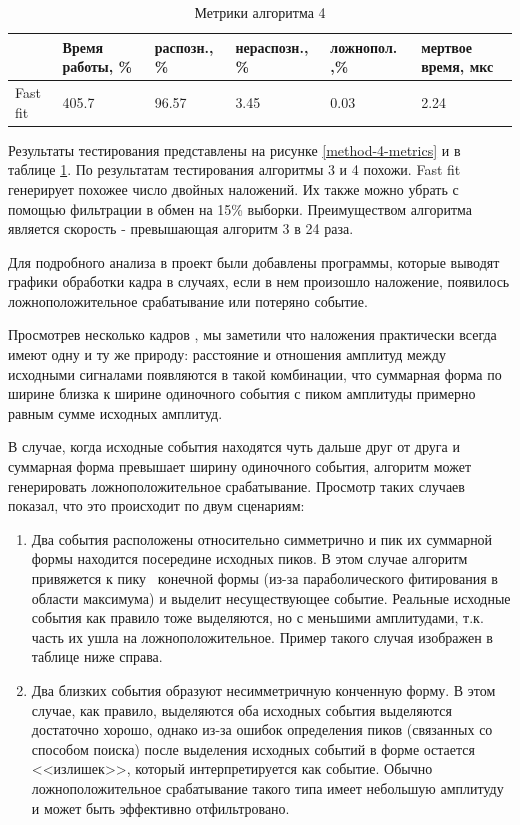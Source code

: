 \documentclass[a4paper,14pt]{extreport}
\begin{document}
\begin{table}
\centering
    \begin{tabular}{|p{}|p{}|p{}|p{}|p{}|p{}|}
        \hline
         & Время работы, \% & распозн., \% & нераспозн., \% & ложнопол. ,\% & мертвое время, мкс \\
        \hline
        Fast fit & 405.7 & 96.57 & 3.45 & 0.03 & 2.24 \\ 
        \hline
    \end{tabular} 
    \caption{Метрики алгоритма 4}
    \label{tbl:methods-compare-2}
\end{table}

Результаты тестирования представлены на рисунке \ref{method-4-metrics} и в таблице \ref{tbl:methods-compare-2}. По результатам тестирования алгоритмы 3 и 4 похожи. Fast fit генерирует похожее число двойных наложений. Их также можно убрать с помощью фильтрации в обмен на 15\% выборки. Преимуществом алгоритма является скорость - превышающая алгоритм 3 в 24 раза.

Для подробного анализа в проект были добавлены программы, которые выводят графики обработки кадра в случаях, если в нем произошло наложение, появилось ложноположительное срабатывание или потеряно событие.

Просмотрев несколько кадров , мы заметили что наложения практически всегда имеют одну и ту же природу: расстояние и отношения амплитуд между исходными сигналами появляются в такой комбинации, что суммарная форма по ширине близка к ширине одиночного события с пиком амплитуды примерно равным сумме исходных амплитуд.

В случае, когда исходные события находятся чуть дальше друг от друга и суммарная форма превышает ширину одиночного события, алгоритм может генерировать ложноположительное срабатывание. Просмотр таких случаев показал, что это происходит по двум сценариям:

\begin{enumerate}
    \item Два события расположены относительно симметрично и пик их суммарной формы находится посередине исходных пиков. В этом случае алгоритм привяжется к пику ~конечной формы (из-за параболического фитирования в области максимума) и выделит несуществующее событие. Реальные исходные события как правило тоже выделяются, но с меньшими амплитудами, т.к. часть их ушла на ложноположительное. Пример такого случая изображен в таблице ниже справа.
    \item Два близких события образуют несимметричную конченную форму. В этом случае, как правило, выделяются оба исходных события выделяются достаточно хорошо, однако из-за ошибок определения пиков (связанных со способом поиска) после выделения исходных событий в форме остается <<излишек>>, который интерпретируется как событие. Обычно ложноположительное срабатывание такого типа имеет небольшую амплитуду и может быть эффективно отфильтровано.
\end{enumerate}
\end{document}
